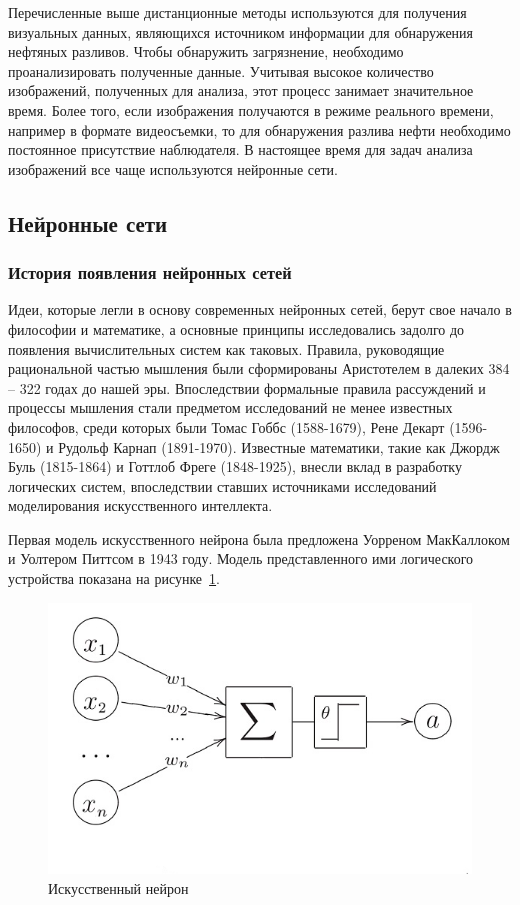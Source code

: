 Перечисленные выше дистанционные методы используются для получения визуальных данных, являющихся источником информации для обнаружения нефтяных разливов. Чтобы обнаружить загрязнение, необходимо проанализировать полученные данные. Учитывая высокое количество изображений, полученных для анализа, этот процесс занимает значительное время. Более того, если изображения получаются в режиме реального времени, например в формате видеосъемки, то для обнаружения разлива нефти необходимо постоянное присутствие наблюдателя. В настоящее время для задач анализа изображений все чаще используются нейронные сети.

\subsection{Нейронные сети}
 
 \subsubsection{История появления нейронных сетей}
 
 Идеи, которые легли в основу современных нейронных сетей, берут свое начало в философии и математике, а основные принципы исследовались задолго до появления вычислительных систем как таковых. Правила, руководящие рациональной частью мышления были сформированы Аристотелем в далеких 384 -- 322 годах до нашей эры. Впоследствии формальные правила рассуждений и процессы мышления стали предметом исследований не менее известных философов, среди которых были Томас Гоббс (1588-1679),  Рене Декарт (1596-1650) и Рудольф Карнап (1891-1970)\cite{nn_history}. Известные математики, такие как Джордж Буль (1815-1864) и Готтлоб Фреге (1848-1925), внесли вклад в разработку логических систем, впоследствии ставших источниками исследований моделирования искусственного интеллекта. 
 
 Первая модель искусственного нейрона была предложена Уорреном МакКаллоком и Уолтером Питтсом в 1943 году. Модель представленного ими логического устройства показана на рисунке~\ref{fig:neuron}.
 
 \begin{figure}[h]
	\centering
	\includegraphics[width=0.7\linewidth]{images/neuron}
	\caption[]{Искусственный нейрон}
	\label{fig:neuron}
\end{figure}

